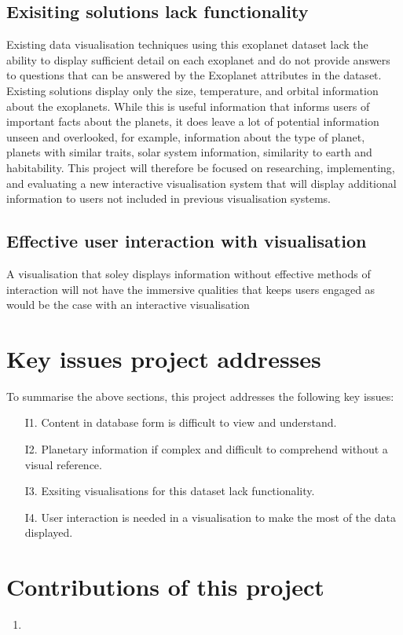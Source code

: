 \subsection{Exisiting solutions lack functionality}
Existing data visualisation techniques using this exoplanet dataset lack the ability to display sufficient detail on each exoplanet and do not provide answers to questions that can be answered by the Exoplanet attributes in the dataset. Existing solutions display only the size, temperature, and orbital information about the exoplanets. While this is useful information that informs users of important facts about the planets, it does leave a lot of potential information unseen and overlooked, for example, information about the type of planet, planets with similar traits, solar system information, similarity to earth and habitability. This project will therefore be focused on researching, implementing, and evaluating a new interactive visualisation system that will display additional information to users not included in previous visualisation systems.

\subsection{Effective user interaction with visualisation}
A visualisation that soley displays information without effective methods of interaction will not have the immersive qualities that keeps users engaged as would be the case with an interactive visualisation
\section{Key issues project addresses}
To summarise the above sections, this project addresses the following key issues:
\begin{enumerate}
 \item[I1.] Content in database form is difficult to view and understand.
 \item[I2.] Planetary information if complex and difficult to comprehend without a visual reference.
 \item[I3.] Exsiting visualisations for this dataset lack functionality.
 \item[I4.] User interaction is needed in a visualisation to make the most of the data displayed.
\end{enumerate}

\section{Contributions of this project}
\begin{enumerate}
 \item 
\end{enumerate}
